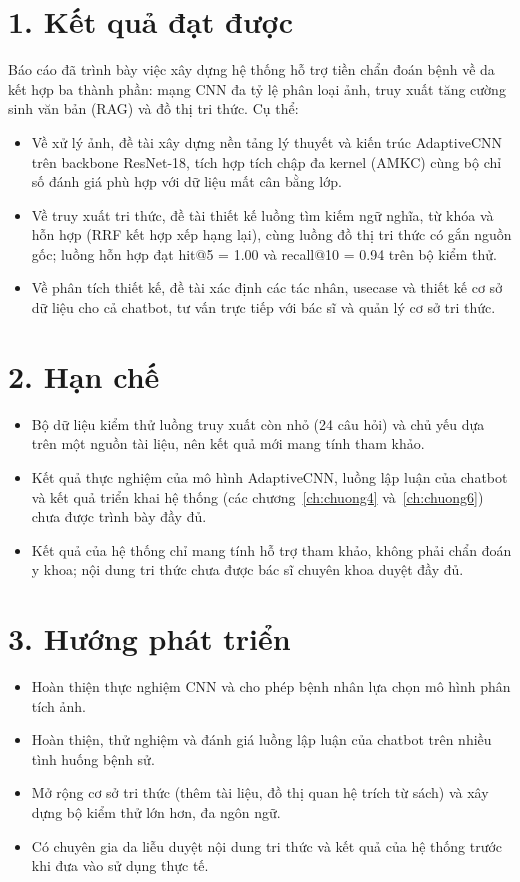 
\section*{1. Kết quả đạt được}


Báo cáo đã trình bày việc xây dựng hệ thống hỗ trợ tiền chẩn đoán bệnh về da kết hợp ba thành phần: mạng CNN đa tỷ lệ phân loại ảnh, truy xuất tăng cường sinh văn bản (RAG) và đồ thị tri thức. Cụ thể:
\begin{itemize}
  \item Về xử lý ảnh, đề tài xây dựng nền tảng lý thuyết và kiến trúc AdaptiveCNN trên backbone ResNet-18, tích hợp tích chập đa kernel (AMKC) cùng bộ chỉ số đánh giá phù hợp với dữ liệu mất cân bằng lớp.
  \item Về truy xuất tri thức, đề tài thiết kế luồng tìm kiếm ngữ nghĩa, từ khóa và hỗn hợp (RRF kết hợp xếp hạng lại), cùng luồng đồ thị tri thức có gắn nguồn gốc; luồng hỗn hợp đạt hit@5 = 1.00 và recall@10 = 0.94 trên bộ kiểm thử.
  \item Về phân tích thiết kế, đề tài xác định các tác nhân, usecase và thiết kế cơ sở dữ liệu cho cả chatbot, tư vấn trực tiếp với bác sĩ và quản lý cơ sở tri thức.
\end{itemize}

\section*{2. Hạn chế}

\begin{itemize}
  \item Bộ dữ liệu kiểm thử luồng truy xuất còn nhỏ (24 câu hỏi) và chủ yếu dựa trên một nguồn tài liệu, nên kết quả mới mang tính tham khảo.
  \item Kết quả thực nghiệm của mô hình AdaptiveCNN, luồng lập luận của chatbot và kết quả triển khai hệ thống (các chương~\ref{ch:chuong4} và~\ref{ch:chuong6}) chưa được trình bày đầy đủ.
  \item Kết quả của hệ thống chỉ mang tính hỗ trợ tham khảo, không phải chẩn đoán y khoa; nội dung tri thức chưa được bác sĩ chuyên khoa duyệt đầy đủ.
\end{itemize}

\section*{3. Hướng phát triển}

\begin{itemize}
  \item Hoàn thiện thực nghiệm CNN và cho phép bệnh nhân lựa chọn mô hình phân tích ảnh.
  \item Hoàn thiện, thử nghiệm và đánh giá luồng lập luận của chatbot trên nhiều tình huống bệnh sử.
  \item Mở rộng cơ sở tri thức (thêm tài liệu, đồ thị quan hệ trích từ sách) và xây dựng bộ kiểm thử lớn hơn, đa ngôn ngữ.
  \item Có chuyên gia da liễu duyệt nội dung tri thức và kết quả của hệ thống trước khi đưa vào sử dụng thực tế.
\end{itemize}
